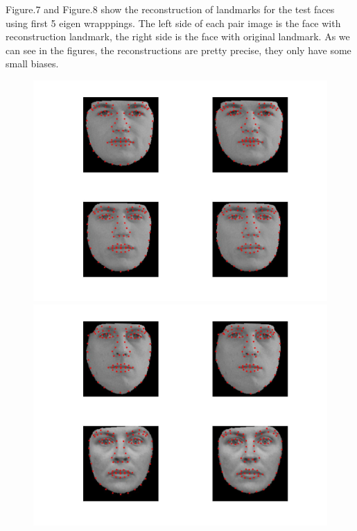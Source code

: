 \documentclass[12pt]{ctexart}
\begin{document}
\begin{enumerate}
Figure.7 and Figure.8 show the reconstruction of landmarks for the test faces using first 5 eigen wrapppings. The left side of each pair image is the face with reconstruction landmark, the right side is the face with original landmark. As we can see in the figures, the reconstructions are pretty precise, they only have some small biases.
\begin{figure}[H]
  \centering
\includegraphics[scale=0.18]{b_com_face_lm1.jpg}
\includegraphics[scale=0.18]{b_com_face_lm2.jpg}

\end{figure}
\end{enumerate}
\end{document}
